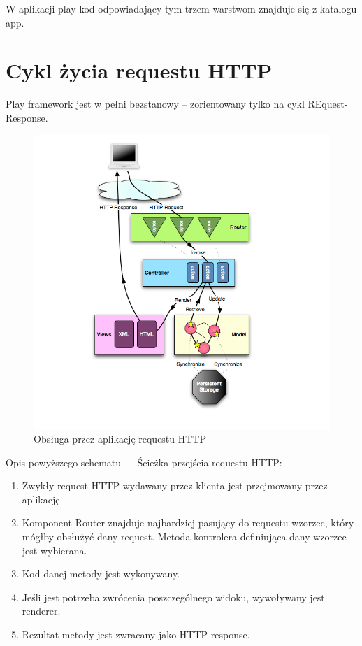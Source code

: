 \documentclass[a4paper,12pt,notitlepage]{mwrep}
\begin{document}
\vspace*{1cm}
\noindent
W aplikacji play kod odpowiadający tym trzem warstwom znajduje się z katalogu app.

\section{Cykl życia requestu HTTP}

Play framework jest w pełni bezstanowy -- zorientowany tylko na cykl REquest-Response.

\begin{figure}[H]
\centering
\includegraphics[scale=0.7]{images/diagrams_path.png}
\caption{Obsługa przez aplikację requestu HTTP}
\label{fig:mvc_2}
\end{figure}


Opis powyższego schematu --- Ścieżka przejścia requestu HTTP:
\begin{enumerate}
	\item	Zwykły request HTTP wydawany przez klienta jest przejmowany przez aplikację.
	\item	Komponent Router znajduje najbardziej pasujący do requestu wzorzec, który mógłby
		obsłużyć dany request. Metoda kontrolera definiująca dany wzorzec jest wybierana.
	\item	Kod danej metody jest wykonywany.
	\item	Jeśli jest potrzeba zwrócenia poszczególnego widoku, wywoływany jest renderer.
	\item	Rezultat metody jest zwracany jako HTTP response.
\end{enumerate}
\end{document}
